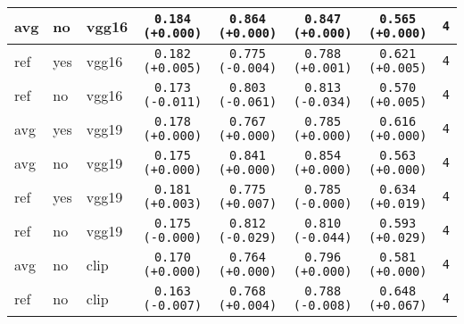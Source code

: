 \begin{tabular}{|l|l|l|c|c|c|c|c|}
\rowcolor{verylightgray}avg & no & vgg16 & \texttt{0.184 {\color{black}(+0.000)}} & \texttt{0.864 {\color{black}(+0.000)}} & \texttt{0.847 {\color{black}(+0.000)}} & \texttt{0.565 {\color{black}(+0.000)}} & \texttt{4} \\
\hline
ref & yes & vgg16 & \texttt{0.182 {\color{green}(+0.005)}} & \texttt{0.775 {\color{green}(-0.004)}} & \texttt{0.788 {\color{red}(+0.001)}} & \texttt{0.621 {\color{green}(+0.005)}} & \texttt{4} \\
ref & no & vgg16 & \texttt{0.173 {\color{red}(-0.011)}} & \texttt{0.803 {\color{green}(-0.061)}} & \texttt{0.813 {\color{green}(-0.034)}} & \texttt{0.570 {\color{green}(+0.005)}} & \texttt{4} \\
\hline
\rowcolor{verylightgray}avg & yes & vgg19 & \texttt{0.178 {\color{black}(+0.000)}} & \texttt{0.767 {\color{black}(+0.000)}} & \texttt{0.785 {\color{black}(+0.000)}} & \texttt{0.616 {\color{black}(+0.000)}} & \texttt{4} \\
\rowcolor{verylightgray}avg & no & vgg19 & \texttt{0.175 {\color{black}(+0.000)}} & \texttt{0.841 {\color{black}(+0.000)}} & \texttt{0.854 {\color{black}(+0.000)}} & \texttt{0.563 {\color{black}(+0.000)}} & \texttt{4} \\
\hline
ref & yes & vgg19 & \texttt{0.181 {\color{green}(+0.003)}} & \texttt{0.775 {\color{red}(+0.007)}} & \texttt{0.785 {\color{black}(-0.000)}} & \texttt{0.634 {\color{green}(+0.019)}} & \texttt{4} \\
ref & no & vgg19 & \texttt{0.175 {\color{black}(-0.000)}} & \texttt{0.812 {\color{green}(-0.029)}} & \texttt{0.810 {\color{green}(-0.044)}} & \texttt{0.593 {\color{green}(+0.029)}} & \texttt{4} \\
\hline
\rowcolor{verylightgray}avg & no & clip & \texttt{0.170 {\color{black}(+0.000)}} & \texttt{0.764 {\color{black}(+0.000)}} & \texttt{0.796 {\color{black}(+0.000)}} & \texttt{0.581 {\color{black}(+0.000)}} & \texttt{4} \\
\hline
ref & no & clip & \texttt{0.163 {\color{red}(-0.007)}} & \texttt{0.768 {\color{red}(+0.004)}} & \texttt{0.788 {\color{green}(-0.008)}} & \texttt{0.648 {\color{green}(+0.067)}} & \texttt{4} \\
\hline
\end{tabular}

